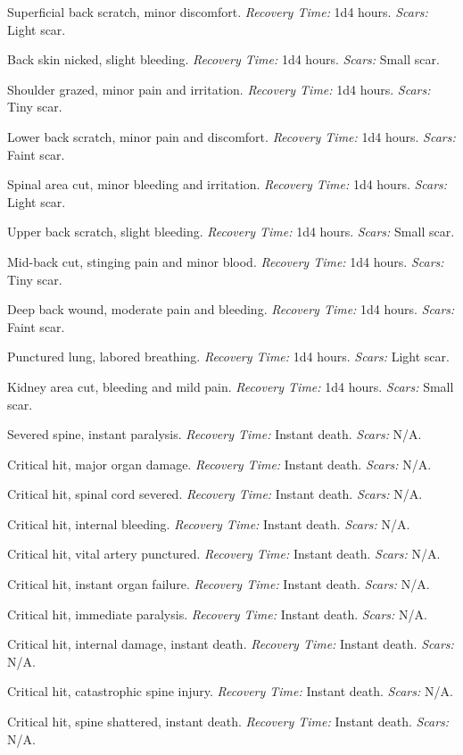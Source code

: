 \documentclass[12pt]{book}  %
\begin{document}
\begin{description}[labelwidth=1.5em, leftmargin=*, itemsep=0.4em]
    \item[1 -] Superficial back scratch, minor discomfort. \textit{Recovery Time:} 1d4 hours. \textit{Scars:} Light scar.
    \item[2 -] Back skin nicked, slight bleeding. \textit{Recovery Time:} 1d4 hours. \textit{Scars:} Small scar.
    \item[3 -] Shoulder grazed, minor pain and irritation. \textit{Recovery Time:} 1d4 hours. \textit{Scars:} Tiny scar.
    \item[4 -] Lower back scratch, minor pain and discomfort. \textit{Recovery Time:} 1d4 hours. \textit{Scars:} Faint scar.
    \item[5 -] Spinal area cut, minor bleeding and irritation. \textit{Recovery Time:} 1d4 hours. \textit{Scars:} Light scar.
    \item[6 -] Upper back scratch, slight bleeding. \textit{Recovery Time:} 1d4 hours. \textit{Scars:} Small scar.
    \item[7 -] Mid-back cut, stinging pain and minor blood. \textit{Recovery Time:} 1d4 hours. \textit{Scars:} Tiny scar.
    \item[8 -] Deep back wound, moderate pain and bleeding. \textit{Recovery Time:} 1d4 hours. \textit{Scars:} Faint scar.
    \item[9 -] Punctured lung, labored breathing. \textit{Recovery Time:} 1d4 hours. \textit{Scars:} Light scar.
    \item[10 -] Kidney area cut, bleeding and mild pain. \textit{Recovery Time:} 1d4 hours. \textit{Scars:} Small scar.
    \item[11 -] Severed spine, instant paralysis. \textit{Recovery Time:} Instant death. \textit{Scars:} N/A.
    \item[12 -] Critical hit, major organ damage. \textit{Recovery Time:} Instant death. \textit{Scars:} N/A.
    \item[13 -] Critical hit, spinal cord severed. \textit{Recovery Time:} Instant death. \textit{Scars:} N/A.
    \item[14 -] Critical hit, internal bleeding. \textit{Recovery Time:} Instant death. \textit{Scars:} N/A.
    \item[15 -] Critical hit, vital artery punctured. \textit{Recovery Time:} Instant death. \textit{Scars:} N/A.
    \item[16 -] Critical hit, instant organ failure. \textit{Recovery Time:} Instant death. \textit{Scars:} N/A.
    \item[17 -] Critical hit, immediate paralysis. \textit{Recovery Time:} Instant death. \textit{Scars:} N/A.
    \item[18 -] Critical hit, internal damage, instant death. \textit{Recovery Time:} Instant death. \textit{Scars:} N/A.
    \item[19 -] Critical hit, catastrophic spine injury. \textit{Recovery Time:} Instant death. \textit{Scars:} N/A.
    \item[20 -] Critical hit, spine shattered, instant death. \textit{Recovery Time:} Instant death. \textit{Scars:} N/A.
\end{description}
\end{document}
